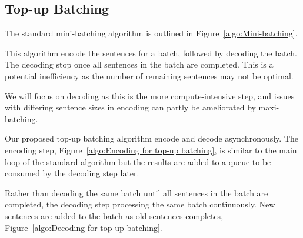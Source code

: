 \documentclass[11pt,a4paper]{article}
\begin{document}
\subsection{Top-up Batching}

The standard mini-batching algorithm is outlined in Figure~\ref{algo:Mini-batching}.


This algorithm encode the sentences for a batch, followed by decoding the batch. The decoding stop once all sentences in the batch are completed. This is a potential inefficiency as the number of remaining sentences may not be optimal.

We will focus on decoding as this is the more compute-intensive step, and issues with differing sentence sizes in encoding can partly be ameliorated by maxi-batching.

Our proposed top-up batching algorithm encode and decode asynchronously. The encoding step, Figure~\ref{algo:Encoding for top-up batching}, is similar to the main loop of the standard algorithm but the results are added to a queue to be consumed by the decoding step later.


Rather than decoding the same batch until all sentences in the batch are completed, the decoding step processing the same batch continuously. New sentences are added to the batch as old sentences completes, Figure~\ref{algo:Decoding for top-up batching}.
\end{document}
